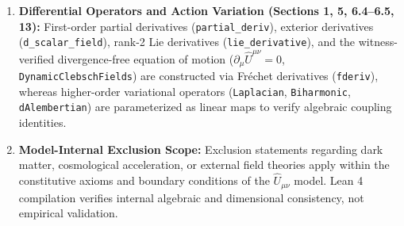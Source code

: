 \begin{enumerate}
    \item \textbf{Differential Operators and Action Variation (Sections 1, 5, 6.4--6.5, 13):} First-order partial derivatives (\texttt{partial\_deriv}), exterior derivatives (\texttt{d\_scalar\_field}), rank-2 Lie derivatives (\texttt{lie\_derivative}), and the witness-verified divergence-free equation of motion ($\partial_\mu \hat{U}^{\mu\nu} = 0$, \texttt{DynamicClebschFields}) are constructed via Fr\'echet derivatives (\texttt{fderiv}), whereas higher-order variational operators (\texttt{Laplacian}, \texttt{Biharmonic}, \texttt{dAlembertian}) are parameterized as linear maps to verify algebraic coupling identities. %
    \item \textbf{Model-Internal Exclusion Scope:} Exclusion statements regarding dark matter, cosmological acceleration, or external field theories apply within the constitutive axioms and boundary conditions of the $\hat{U}_{\mu\nu}$ model. Lean 4 compilation verifies internal algebraic and dimensional consistency, not empirical validation. %
\end{enumerate} %

\newpage

